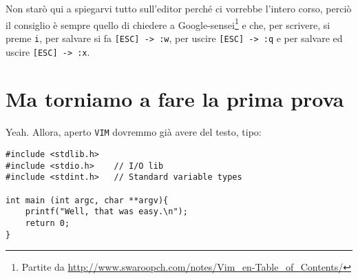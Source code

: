 \documentclass[a4paper]{memoir}
\begin{document}
        Non starò qui a spiegarvi tutto sull'editor perché ci vorrebbe l'intero corso, perciò il consiglio è sempre
        quello di chiedere a Google-sensei\footnote{Partite da \url{http://www.swaroopch.com/notes/Vim_en-Table_of_Contents/}}
        e che, per scrivere, si preme \texttt{i}, per salvare si fa \texttt{[ESC] -> :w}, per uscire \texttt{[ESC] -> :q} 
        e per salvare ed uscire \texttt{[ESC] -> :x}.
        
	\section{Ma torniamo a fare la prima prova}
		
		Yeah. Allora, aperto \texttt{VIM} dovremmo già avere del testo, tipo:
		
	    \begin{Verbatim}[label={UNF, DAT syntax highlighting (dentro VIM)}]
#include <stdlib.h>
#include <stdio.h>    // I/O lib
#include <stdint.h>   // Standard variable types

int main (int argc, char **argv){
    printf("Well, that was easy.\n");
    return 0;
}
		\end{Verbatim}
		
		
\end{document}

